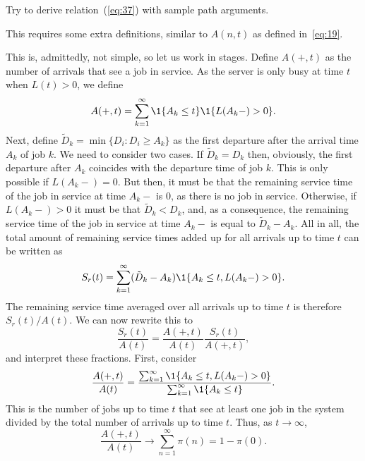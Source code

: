 \begin{exercise}
  Try to derive relation~(\ref{eq:37}) with sample path
  arguments. 
  \begin{hint}
This requires some extra definitions, similar to
  $A(n,t)$ as defined in~\eqref{eq:19}.
  \end{hint}
  \begin{solution}
    This is, admittedly, not simple, so let us work in stages. Define
    $A(+,t)$ as the number of arrivals that see a job in service. As
    the server is only busy at time $t$ when $L(t)>0$, we define
    \begin{equation*}
      A(+,t) = \sum_{k=1}^\infty \1{A_k\leq t}\1{L(A_k-) > 0}.
    \end{equation*}
    Next, define $\tilde D_k = \min\{D_i: D_i \geq A_k\}$ as the first
    departure after the arrival time $A_k$ of job $k$. We need to
    consider two cases. If $\tilde D_k = D_k$ then, obviously, the
    first departure after $A_k$ coincides with the departure time of
    job $k$. This is only possible if $L(A_k-) = 0$. But then, it must
    be that the remaining service time of the job in service at time
    $A_k-$ is 0, as there is no job in service. Otherwise, if
    $L(A_k-)>0$ it must be that $\tilde D_k < D_k$, and, as a
    consequence, the remaining service time of the job in service at
    time $A_k-$ is equal to $\tilde D_k - A_k$. All in all, the total
    amount of remaining service times added up for all arrivals up to
    time $t$ can be written as
    \begin{equation*}
      S_r(t) = \sum_{k=1}^\infty (\tilde D_k - A_k) \1{A_k \leq t, L(A_k-) > 0}.
    \end{equation*}
    The remaining service time averaged over all arrivals up to
    time $t$ is therefore $S_r(t)/A(t)$. We can now rewrite this to
\begin{equation*}
  \frac{S_r(t)}{A(t)} = 
  \frac{A(+,t)}{A(t)} \frac{S_r(t)}{A(+,t)}, 
\end{equation*}
and interpret these fractions.  First, consider
\begin{equation*}
  \frac{A(+,t)}{A(t)} = 
\frac{\sum_{k=1}^\infty \1{A_k\leq t, L(A_k-) > 0}}{\sum_{k=1}^\infty \1{A_k\leq t}}.
\end{equation*}
This is the number of jobs up to time $t$ that see at least one job in
the system divided by the total number of arrivals up to time $t$. Thus, as $t\to\infty$, 
\begin{equation*}
  \frac{A(+,t)}{A(t)} \to \sum_{n=1}^\infty \pi(n) = 1-\pi(0).

\end{equation*}
\end{solution}
\end{exercise}
